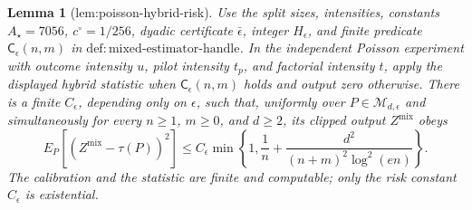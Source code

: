 \documentclass{article}
\newtheorem{lemma}{Lemma}
\begin{document}
\begin{lemma}[lem:poisson-hybrid-risk]\label{lem:poisson-hybrid-risk}
Use the split sizes, intensities, constants \(A_\star=7056\), \(c^\circ=1/256\), dyadic certificate \(\bar\epsilon\), integer \(H_\epsilon\), and finite predicate \(\mathsf C_\epsilon(n,m)\) in \(\mathrm{def:mixed\mbox{-}estimator\mbox{-}handle}\).  In the independent Poisson experiment with outcome intensity \(u\), pilot intensity \(t_p\), and factorial intensity \(t\), apply the displayed hybrid statistic when \(\mathsf C_\epsilon(n,m)\) holds and output zero otherwise.  There is a finite \(C_\epsilon\), depending only on \(\epsilon\), such that, uniformly over \(P\in\mathcal M_{d,\epsilon}\) and simultaneously for every \(n\ge1\), \(m\ge0\), and \(d\ge2\), its clipped output \(Z^{\mathrm{mix}}\) obeys
\[
 E_P[(Z^{\mathrm{mix}}-\tau(P))^2]
 \le C_\epsilon\min\!\left\{1,\frac1n+\frac{d^2}{(n+m)^2\log^2(en)}\right\}. \tag{C14}
\]
The calibration and the statistic are finite and computable; only the risk constant \(C_\epsilon\) is existential.
\end{lemma}
\end{document}
